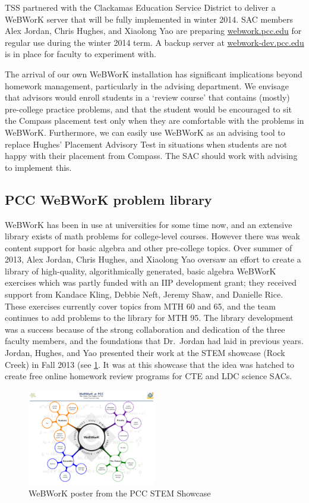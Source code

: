 TSS partnered with the Clackamas Education Service District to deliver a WeBWorK server that will be fully implemented in winter 2014.  SAC members Alex Jordan, Chris Hughes, and Xiaolong Yao are preparing \href{http://webwork.pcc.edu}{webwork.pcc.edu} for regular use during the winter 2014 term. A backup server at \href{http://webwork-dev.pcc.edu}{webwork-dev.pcc.edu} is in place for faculty to experiment with. 

The arrival of our own WeBWorK installation has significant implications beyond homework management, particularly in the advising department. We envisage that advisors would enroll students in a `review course' that contains (mostly) pre-college practice problems, and that the student would be encouraged to sit the Compass placement test only when they are comfortable with the problems in WeBWorK. Furthermore, we can easily use WeBWorK as an advising tool to replace Hughes' Placement Advisory Test in situations when students are not happy with their placement from Compass.  The SAC should work with advising to implement this. 

\subsection{PCC WeBWorK problem library}
WeBWorK has been in use at universities for some time now, and an extensive library exists of math problems for college-level courses. However there was weak content support for basic algebra and other pre-college topics. Over summer of 2013, Alex Jordan, Chris Hughes, and Xiaolong Yao oversaw an effort to create a library of high-quality, algorithmically generated, basic algebra WeBWorK exercises which was partly funded with an IIP development grant; they received support from Kandace Kling, Debbie Neft, Jeremy Shaw, and Danielle Rice.  These exercises currently cover topics from MTH 60 and 65, and the team continues to add problems to the library for MTH 95. The library development was a success because of the strong collaboration and dedication of the three faculty members, and the foundations that Dr.\ Jordan had laid in previous years. Jordan, Hughes, and Yao presented their work at the STEM showcase (Rock Creek) in Fall 2013 (see \cref{webworkposter}. It was at this showcase that the idea was hatched to create free online homework review programs for CTE and LDC science SACs.

\begin{figure}[!htb]
	\centering
	\includegraphics[width=0.5\textwidth]{webworkposter.pdf}
	\caption{WeBWorK poster from the PCC STEM Showcase}\label{webworkposter}
\end{figure}

